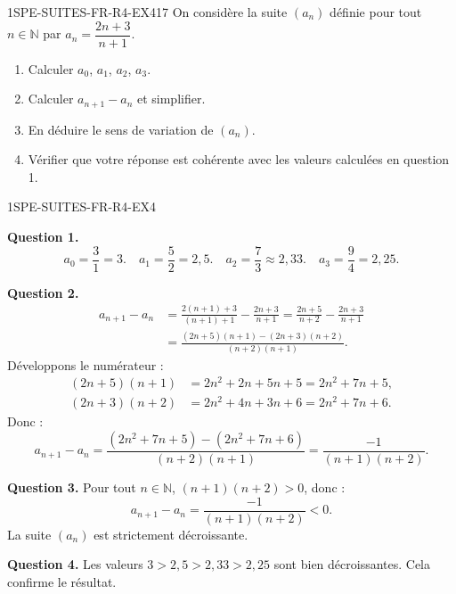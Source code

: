 
\begin{exercice}{1SPE-SUITES-FR-R4-EX4}{1}{7}
On considère la suite $(a_n)$ définie pour tout $n \in \mathbb{N}$ par $a_n = \dfrac{2n + 3}{n + 1}$.
\begin{enumerate}
  \item Calculer $a_0$, $a_1$, $a_2$, $a_3$.
  \item Calculer $a_{n+1} - a_n$ et simplifier.
  \item En déduire le sens de variation de $(a_n)$.
  \item Vérifier que votre réponse est cohérente avec les valeurs calculées en question 1.
\end{enumerate}
\end{exercice}


\begin{corrige}{1SPE-SUITES-FR-R4-EX4}

\textbf{Question 1.}
\[
a_0 = \frac{3}{1} = 3. \quad a_1 = \frac{5}{2} = 2{,}5. \quad a_2 = \frac{7}{3} \approx 2{,}33. \quad a_3 = \frac{9}{4} = 2{,}25.
\]


\textbf{Question 2.}
\begin{align*}
a_{n+1} - a_n &= \frac{2(n+1)+3}{(n+1)+1} - \frac{2n+3}{n+1}
               = \frac{2n+5}{n+2} - \frac{2n+3}{n+1} \\
              &= \frac{(2n+5)(n+1) - (2n+3)(n+2)}{(n+2)(n+1)}.
\end{align*}
Développons le numérateur :
\begin{align*}
(2n+5)(n+1) &= 2n^2 + 2n + 5n + 5 = 2n^2 + 7n + 5, \\
(2n+3)(n+2) &= 2n^2 + 4n + 3n + 6 = 2n^2 + 7n + 6.
\end{align*}
Donc :
\[
a_{n+1} - a_n = \frac{(2n^2+7n+5)-(2n^2+7n+6)}{(n+2)(n+1)} = \frac{-1}{(n+1)(n+2)}.
\]


\textbf{Question 3.} Pour tout $n \in \mathbb{N}$, $(n+1)(n+2) > 0$, donc :
\[
a_{n+1} - a_n = \frac{-1}{(n+1)(n+2)} < 0.
\]
La suite $(a_n)$ est strictement décroissante.

\textbf{Question 4.} Les valeurs $3 > 2{,}5 > 2{,}33 > 2{,}25$ sont bien décroissantes. Cela confirme le résultat.

\end{corrige}
